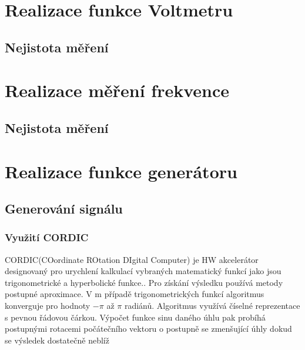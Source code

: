 \section{Realizace funkce Voltmetru}
\subsection{Nejistota měření}
\section{Realizace měření frekvence}
\subsection{Nejistota měření}
\section{Realizace funkce generátoru}
\subsection{Generování signálu}
\subsubsection{Využití CORDIC}    
CORDIC(COordinate ROtation DIgital Computer) je HW akcelerátor designovaný pro urychlení kalkulací vybraných matematický funkcí jako jsou trigonometrické a hyperbolické funkce.\cite{CORDIC}. Pro získání výsledku používá metody postupné aproximace. V m    případě trigonometrických funkcí algoritmus konverguje pro hodnoty $-\pi$ až $\pi$ radiánů. Algoritmus využívá číselné reprezentace s pevnou řádovou čárkou.  Výpočet funkce sinu daného úhlu pak probíhá postupnými rotacemi počátečního vektoru o postupně se zmenšující úhly dokud se výsledek dostatečně neblíž

